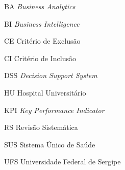 
\begin{siglas}
	\item[BA]{\textit{Business Analytics}}
    \item[BI]{\textit{Business Intelligence}}
    \item[CE]{Critério de Exclusão}
    \item[CI]{Critério de Inclusão}
    \item[DSS]{\textit{Decision Support System}}
  	\item[HU]{Hospital Universitário}
    \item[KPI]{\textit{Key Performance Indicator}}
    \item[RS]{Revisão Sistemática}
    \item[SUS]{Sistema Único de Saúde}
	\item[UFS]{Universidade Federal de Sergipe}
	\item[]{}
\end{siglas}